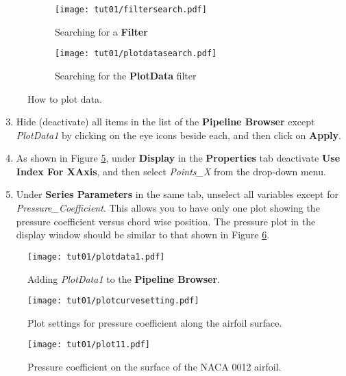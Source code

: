 \begin{figure}[ht]
    \centering
     \begin{subfigure}[b]{.4\textwidth}
         \centering
         \texttt{[image: tut01/filtersearch.pdf]}
         \caption{Searching for a \textbf{Filter}}
         \label{fig1:plotdata a}
     \end{subfigure}
     \hfill
     \begin{subfigure}[b]{.4\textwidth}
         \centering
         \texttt{[image: tut01/plotdatasearch.pdf]}
         \caption{Searching for the \textbf{PlotData} filter}
         \label{fig1:plotdata b}
     \end{subfigure}     
    \caption{How to plot data.}
    \label{fig1:plotdata}
\end{figure}
\begin{enumerate}[label=\arabic*)]
	\setcounter{enumi}{2}
	\item Hide (deactivate) all items in the list of the \textbf{Pipeline Browser} except \textit{PlotData1} by clicking on the eye icons beside each, and then click on \textbf{Apply}.
	\item As shown in Figure \ref{fig1:pointsx}, under \textbf{Display} in the \textbf{Properties} tab deactivate \textbf{Use Index For XAxis}, and then select \textit{Points\_X} from the drop-down menu.
	\item Under \textbf{Series Parameters} in the same tab, unselect all variables except for \textit{Pressure\_Coefficient}. This allows you to have only one plot showing the pressure coefficient versus chord wise position. The pressure plot in the display window should be similar to that shown in Figure \ref{fig1:surface_pressure}.
\end{enumerate}
\begin{figure}[ht]
    \centering
    \texttt{[image: tut01/plotdata1.pdf]}
    \caption{Adding \textit{PlotData1} to the \textbf{Pipeline Browser}.}
    \label{fig1:plotdata-list}
\end{figure}
\begin{figure}[H]
    \centering
    \texttt{[image: tut01/plotcurvesetting.pdf]}
    \caption{Plot settings for pressure coefficient along the airfoil surface.}
    \label{fig1:pointsx}
\end{figure}
\begin{figure}[ht]
    \centering
    \texttt{[image: tut01/plot11.pdf]}
    \caption{Pressure coefficient on the surface of the NACA 0012 airfoil.}
    \label{fig1:surface_pressure}
\end{figure}
